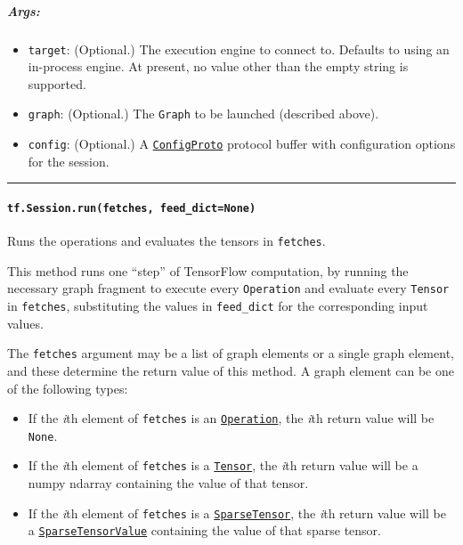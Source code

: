\subparagraph{Args: }\label{args}

\begin{itemize}
\tightlist
\item
  \texttt{target}: (Optional.) The execution engine to connect to.
  Defaults to using an in-process engine. At present, no value other
  than the empty string is supported.
\item
  \texttt{graph}: (Optional.) The \texttt{Graph} to be launched
  (described above).
\item
  \texttt{config}: (Optional.) A
  \href{https://tensorflow.googlesource.com/tensorflow/+/master/tensorflow/core/framework/config.proto}{\texttt{ConfigProto}}
  protocol buffer with configuration options for the session.
\end{itemize}

\begin{center}\rule{0.5\linewidth}{\linethickness}\end{center}

\paragraph{\texorpdfstring{\texttt{tf.Session.run(fetches,\ feed\_dict=None)}
}{tf.Session.run(fetches, feed\_dict=None) }}\label{tf.session.run}

Runs the operations and evaluates the tensors in \texttt{fetches}.

This method runs one ``step'' of TensorFlow computation, by running the
necessary graph fragment to execute every \texttt{Operation} and
evaluate every \texttt{Tensor} in \texttt{fetches}, substituting the
values in \texttt{feed\_dict} for the corresponding input values.

The \texttt{fetches} argument may be a list of graph elements or a
single graph element, and these determine the return value of this
method. A graph element can be one of the following types:

\begin{itemize}
\tightlist
\item
  If the \emph{i}th element of \texttt{fetches} is an
  \href{../../api_docs/python/framework.md\#Operation}{\texttt{Operation}},
  the \emph{i}th return value will be \texttt{None}.
\item
  If the \emph{i}th element of \texttt{fetches} is a
  \href{../../api_docs/python/framework.md\#Tensor}{\texttt{Tensor}},
  the \emph{i}th return value will be a numpy ndarray containing the
  value of that tensor.
\item
  If the \emph{i}th element of \texttt{fetches} is a
  \href{../../api_docs/python/sparse_ops.md\#SparseTensor}{\texttt{SparseTensor}},
  the \emph{i}th return value will be a
  \href{../../api_docs/python/sparse_ops.md\#SparseTensorValue}{\texttt{SparseTensorValue}}
  containing the value of that sparse tensor.
\end{itemize}

